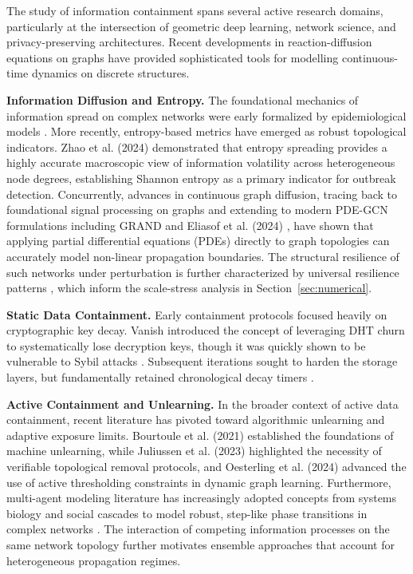 \documentclass[review,12pt]{elsarticle}
\begin{document}
The study of information containment spans several active research domains, particularly at the intersection of geometric deep learning, network science, and privacy-preserving architectures. Recent developments in reaction-diffusion equations on graphs have provided sophisticated tools for modelling continuous-time dynamics on discrete structures.

\textbf{Information Diffusion and Entropy.} The foundational mechanics of information spread on complex networks were early formalized by epidemiological models \cite{pastor2015epidemic}. More recently, entropy-based metrics have emerged as robust topological indicators. Zhao et al. (2024) \cite{zhao2024entropy} demonstrated that entropy spreading provides a highly accurate macroscopic view of information volatility across heterogeneous node degrees, establishing Shannon entropy as a primary indicator for outbreak detection. Concurrently, advances in continuous graph diffusion, tracing back to foundational signal processing on graphs \cite{shuman2013emerging} and extending to modern PDE-GCN formulations including GRAND \cite{chamberlain2021grand} and Eliasof et al. (2024) \cite{eliasof2024graph}, have shown that applying partial differential equations (PDEs) directly to graph topologies can accurately model non-linear propagation boundaries. The structural resilience of such networks under perturbation is further characterized by universal resilience patterns \cite{gao2016universal}, which inform the scale-stress analysis in Section~\ref{sec:numerical}.

\textbf{Static Data Containment.} Early containment protocols focused heavily on cryptographic key decay. Vanish \cite{geambasu2009vanish} introduced the concept of leveraging DHT churn to systematically lose decryption keys, though it was quickly shown to be vulnerable to Sybil attacks \cite{wolchok2010defeating}. Subsequent iterations \cite{tang2010fades, perlman2005ephemerizer} sought to harden the storage layers, but fundamentally retained chronological decay timers \cite{douceur2002sybil}.

\textbf{Active Containment and Unlearning.} In the broader context of active data containment, recent literature has pivoted toward algorithmic unlearning and adaptive exposure limits. Bourtoule et al. (2021) \cite{bourtoule2021machine} established the foundations of machine unlearning, while Juliussen et al. (2023) \cite{juliussen2023machine} highlighted the necessity of verifiable topological removal protocols, and Oesterling et al. (2024) \cite{oesterling2024aistats} advanced the use of active thresholding constraints in dynamic graph learning. Furthermore, multi-agent modeling literature has increasingly adopted concepts from systems biology \cite{alon2019introduction} and social cascades \cite{watts2002social} to model robust, step-like phase transitions in complex networks \cite{guilbeault2018complex}. The interaction of competing information processes on the same network topology \cite{karrer2011competing} further motivates ensemble approaches that account for heterogeneous propagation regimes.
\end{document}

